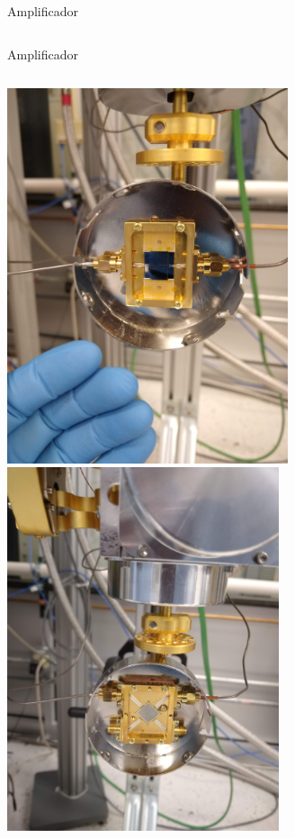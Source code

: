 \documentclass[ignorenonframetext,12pt]{beamer}
\begin{document}
\begin{frame}{Amplificador}
\begin{columns}
\begin{column}{0.45\textwidth}
								\end{column}
				\end{columns}
\end{frame}
\begin{frame}{Amplificador}
				\begin{columns}
								\begin{column}{0.45\textwidth}
												\includegraphics[angle=-90,width=0.62\textwidth]{mkid1} \\ 
												\includegraphics[angle=-90,width=0.6\textwidth]{mkid2}
								\end{column}

\end{columns}
\end{frame}
\end{document}
